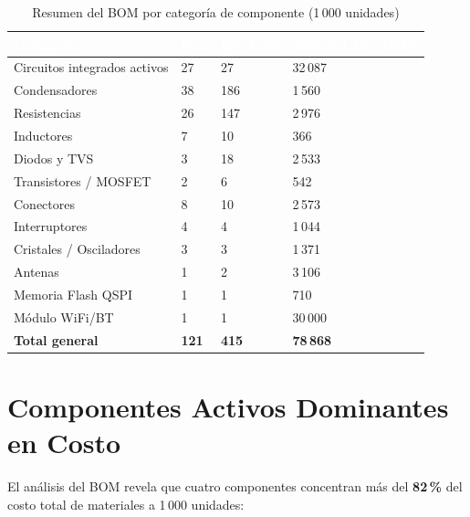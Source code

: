 \begin{table}[H]
  \centering
  \caption{Resumen del BOM por categoría de componente (1\,000 unidades)}
  \label{tab:bom_resumen_cat}
  \begin{tabular}{L{4.2cm} R{1.5cm} R{2.0cm} R{2.2cm}}
    \toprule
    \textcolor{white}{\textbf{Categoría}} &
    \textcolor{white}{\textbf{Pos.}} &
    \textcolor{white}{\textbf{Qty total}} &
    \textcolor{white}{\textbf{Subtotal 1K (USD)}} \\
    \midrule
    Circuitos integrados activos  & 27 &  27 & 32\,087 \\
    Condensadores                 & 38 & 186 &  1\,560 \\
    Resistencias                  & 26 & 147 &  2\,976 \\
    Inductores                    &  7 &  10 &    366 \\
    Diodos y TVS                  &  3 &  18 &  2\,533 \\
    Transistores / MOSFET         &  2 &   6 &    542 \\
    Conectores                    &  8 &  10 &  2\,573 \\
    Interruptores                 &  4 &   4 &  1\,044 \\
    Cristales / Osciladores       &  3 &   3 &  1\,371 \\
    Antenas                       &  1 &   2 &  3\,106 \\
    Memoria Flash QSPI            &  1 &   1 &    710 \\
    Módulo WiFi/BT                &  1 &   1 & 30\,000 \\
    \midrule
    \textbf{Total general}        & \textbf{121} & \textbf{415} &
    \textbf{78\,868} \\
    \bottomrule
  \end{tabular}
\end{table}

\section{Componentes Activos Dominantes en Costo}
\label{sec:bom_dominantes}

El análisis del BOM revela que cuatro componentes concentran más del
\textbf{82\,\%} del costo total de materiales a 1\,000 unidades:

